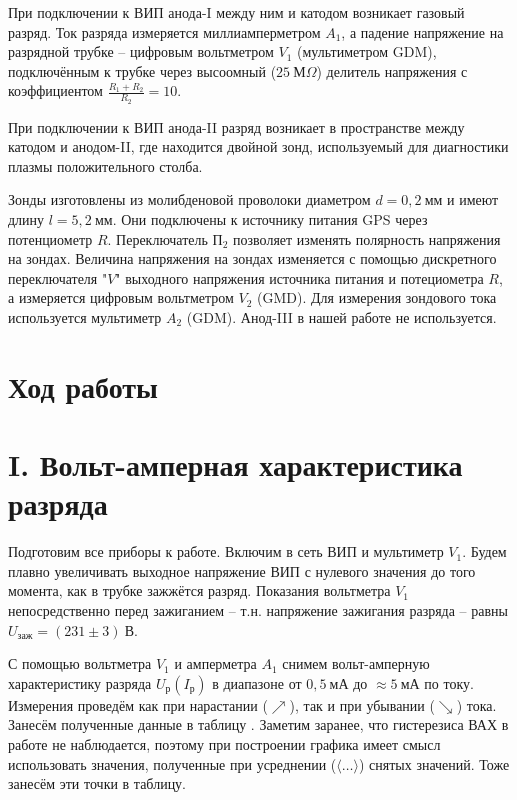 \documentclass[a4paper,10pt]{article}
\begin{document}
При подключении к ВИП анода-I между ним и катодом возникает газовый разряд. Ток разряда измеряется миллиамперметром $A_1$, а падение напряжение на разрядной трубке -- цифровым вольтметром $V_1$ (мультиметром GDM), подключённым к трубке через высоомный ($25~\text{М}\Omega$) делитель напряжения с коэффициентом $\frac{R_1+R_2}{R_2}=10$.

При подключении к ВИП анода-II разряд возникает в пространстве между катодом и анодом-II, где находится двойной зонд, используемый для диагностики плазмы положительного столба.

Зонды изготовлены из молибденовой проволоки диаметром $d=0,2~\text{мм}$ и имеют длину $l=5,2~\text{мм}$. Они подключены к источнику питания GPS через потенциометр $R$. Переключатель $\text{П}_2$ позволяет изменять полярность напряжения на зондах. Величина напряжения на зондах изменяется с помощью дискретного переключателя "$V$" выходного напряжения источника питания и потециометра $R$, а измеряется цифровым вольтметром $V_2$ (GMD). Для измерения зондового тока используется мультиметр $A_2$ (GDM). Анод-III в нашей работе не используется.

\section*{Ход работы}

\section*{I. Вольт-амперная характеристика разряда}

Подготовим все приборы к работе. Включим в сеть ВИП и мультиметр $V_1$. Будем плавно увеличивать выходное напряжение ВИП с нулевого значения до того момента, как в трубке зажжётся разряд. Показания вольтметра $V_1$ непосредственно перед зажиганием -- т.н. напряжение зажигания разряда -- равны $U_{\text{заж}}=\left(231\pm3\right)~\text{В}$.

С помощью вольтметра $V_1$ и амперметра $A_1$ снимем вольт-амперную характеристику разряда $U_{\text{р}}\left(I_{\text{р}}\right)$ в диапазоне от $0,5~\text{мА}$ до $\approx5~\text{мА}$ по току. Измерения проведём как при нарастании ($\nearrow$), так и при убывании ($\searrow$) тока. Занесём полученные данные в таблицу . Заметим заранее, что гистерезиса ВАХ в работе не наблюдается, поэтому при построении графика имеет смысл использовать значения, полученные при усреднении ($\langle\ldots\rangle$) снятых значений. Тоже занесём эти точки в таблицу.
\end{document}
